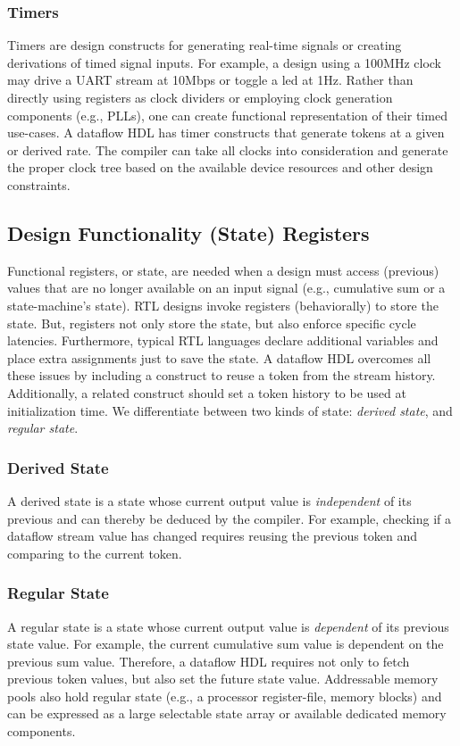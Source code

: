 \subsubsection{Timers}
Timers are design constructs for generating real-time signals or creating derivations of timed signal inputs. For example, a design using a 100MHz clock may drive a UART stream at 10Mbps or toggle a led at 1Hz. Rather than directly using registers as clock dividers or employing clock generation components (e.g., PLLs), one can create functional representation of their timed use-cases. A dataflow HDL has timer constructs that generate tokens at a given or derived rate. The compiler can take all clocks into consideration and generate the proper clock tree based on the available device resources and other design constraints. 

\subsection{Design Functionality (State) Registers}
Functional registers, or state, are needed when a design must access (previous) values that are no longer available on an input signal (e.g., cumulative sum or a state-machine's state). RTL designs invoke registers (behaviorally) to store the state. But, registers not only store the state, but also enforce specific cycle latencies. Furthermore, typical RTL languages declare additional variables and place extra assignments just to save the state. A dataflow HDL overcomes all these issues by including a construct to reuse a token from the stream history. Additionally, a related construct should set a token history to be used at initialization time.
We differentiate between two kinds of state: \textit{derived state}, and \textit{regular state}. 


\subsubsection{Derived State} 
A derived state is a state whose current output value is \textit{independent} of its previous and can thereby be deduced by the compiler. For example, checking if a dataflow stream value has changed requires reusing the previous token and comparing to the current token. 

\subsubsection{Regular State} 
A regular state is a state whose current output value is \textit{dependent} of its previous state value. For example, the current cumulative sum value is dependent on the previous sum value. Therefore, a dataflow HDL requires not only to fetch previous token values, but also set the future state value. Addressable memory pools also hold regular state (e.g., a processor register-file, memory blocks) and can be expressed as a large selectable state array or available dedicated memory components.

